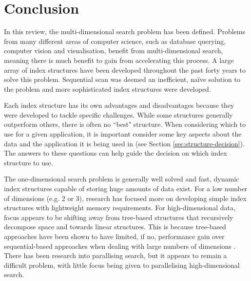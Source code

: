\section{Conclusion}

In this review, the multi-dimensional search problem has been defined. Problems from many different areas of computer science, such as database querying, computer vision and visualisation, benefit from multi-dimensional search, meaning there is much benefit to gain from accelerating this process. A large array of index structures have been developed throughout the past forty years to solve this problem. Sequential scan was deemed an inefficient, na\"{i}ve solution to the problem and more sophisticated index structures were developed.

Each index structure has its own advantages and disadvantages because they were developed to tackle specific challenges. While some structures generally outperform others, there is often no ``best" structure. When considering which to use for a given application, it is important consider some key aspects about the data and the application it is being used in (see Section \ref{sec:structure-decision}). The answers to these questions can help guide the decision on which index structure to use.

The one-dimensional search problem is generally well solved and fast, dynamic index structures capable of storing huge amounts of data exist. For a low number of dimensions (e.g. 2 or 3), research has focused more on developing simple index structures with lightweight memory requirements. For high-dimensional data, focus appears to be shifting away from tree-based structures that recursively decompose space and towards linear structures. This is because tree-based approaches have been shown to have limited, if no, performance gain over sequential-based approaches when dealing with large numbers of dimensions \cite{md-structures-samet}. There has been research into parallising search, but it appears to remain a difficult problem, with little focus being given to parallelising high-dimensional search.
